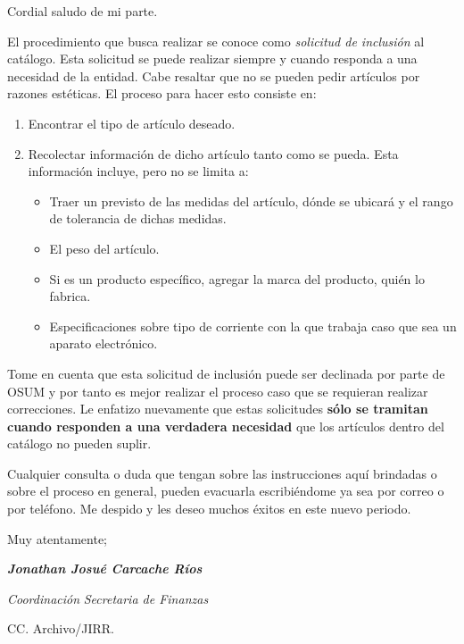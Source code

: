 \documentclass[12pt]{article}
\begin{document}
Cordial saludo de mi parte.\par
El procedimiento que busca realizar se conoce como \emph{solicitud de inclusión} al catálogo. Esta solicitud se puede realizar siempre y cuando responda a una necesidad de la entidad. Cabe resaltar que no se pueden pedir artículos por razones estéticas. El proceso para hacer esto consiste en:
\begin{enumerate}
    \item Encontrar el tipo de artículo deseado.
    \item Recolectar información de dicho artículo tanto como se pueda. Esta información incluye, pero no se limita a: 
    \begin{itemize}
        \item Traer un previsto de las medidas del artículo, dónde se ubicará y el rango de tolerancia de dichas medidas.
        \item El peso del artículo.
        \item Si es un producto específico, agregar la marca del producto, quién lo fabrica.
        \item Especificaciones sobre tipo de corriente con la que trabaja caso que sea un aparato electrónico.
    \end{itemize}
\end{enumerate}
Tome en cuenta que esta solicitud de inclusión puede ser declinada por parte de OSUM y por tanto es mejor realizar el proceso caso que se requieran realizar correcciones. Le enfatizo nuevamente que estas solicitudes \textbf{sólo se tramitan cuando responden a una verdadera necesidad} que los artículos dentro del catálogo no pueden suplir.\par 
Cualquier consulta o duda que tengan sobre las instrucciones aquí brindadas o sobre el proceso en general, pueden evacuarla escribiéndome ya sea por correo o por teléfono. Me despido y les deseo muchos éxitos en este nuevo periodo.\par
Muy atentamente;\par
\bigskip
\bigskip
\bigskip
\begin{spacing}{1}
\textit{\textbf{Jonathan Josué Carcache Ríos}}\par
\textit{Coordinación}
\textit{Secretaria de Finanzas}
\end{spacing}
\medskip
\begin{flushleft}\begin{spacing}{1}
 \scriptsize{CC. Archivo/JIRR.

 }
\end{spacing}\end{flushleft}
%
%
\end{document}
